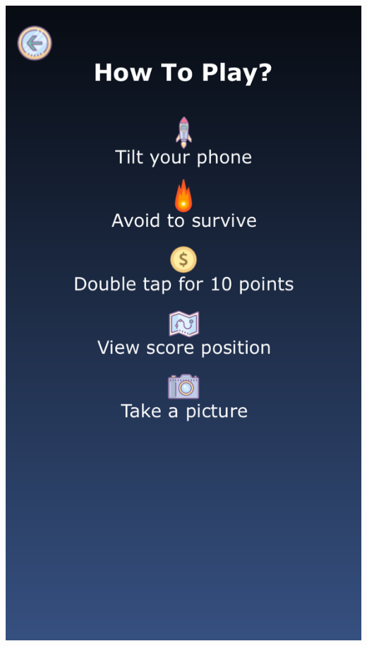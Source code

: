 \documentclass{article}
\begin{document}
\begin{center}
    \includegraphics[scale = 0.2]{images/iOS_en.PNG}

\end{center}
\end{document}
